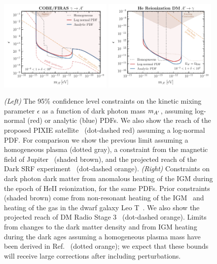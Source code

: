 \documentclass[prd,aps,10pt,nofootinbib,twocolumn,superscriptaddress,preprintnumbers,balancelastpage,longbibliography]{revtex4-1}
\begin{document}
%
\begin{figure}[!htbp]
    \centering
    \includegraphics[width=0.49\textwidth]{plots/limit}
    \includegraphics[width=0.49\textwidth]{plots/limit_DP_DM.pdf}
    \caption{\emph{(Left)} The 95\% confidence level constraints on the kinetic mixing parameter $\epsilon$ as a function of dark photon mass $m_{A^\prime}$, assuming log-normal (red) or analytic (blue) PDFs.  We also show the reach of the proposed PIXIE satellite~\cite{Kogut:2011xw} (dot-dashed red) assuming a log-normal PDF\@.  For comparison we show the previous limit assuming a homogeneous plasma (dotted gray), a constraint from the magnetic field of Jupiter~\cite{Davis:1975mn,Ahlers:2008qc} (shaded brown), and the projected reach of the Dark SRF experiment~\cite{HarnikSRF,GrassellinoSRF} (dot-dashed orange). 
\emph{(Right)} Constraints on dark photon dark matter from anomalous heating of the IGM during the epoch of HeII reionization, for the same PDFs. Prior constraints (shaded brown) come from non-resonant heating of the IGM~\cite{McDermott:2019lch} and heating of the gas in the dwarf galaxy Leo T~\cite{Wadekar:2019xnf}.  We also show the projected reach of DM Radio Stage 3~\cite{Chaudhuri:2014dla,Silva-Feaver:2016qhh,Battaglieri:2017aum} (dot-dashed orange). Limits from changes to the dark matter density and from IGM heating during the dark ages assuming a homogeneous plasma mass have been derived in Ref.~\cite{McDermott:2019lch} (dotted orange); we expect that these bounds will receive large corrections after including perturbations. } 
    \label{fig:limit}
\end{figure}
%
\end{document}
